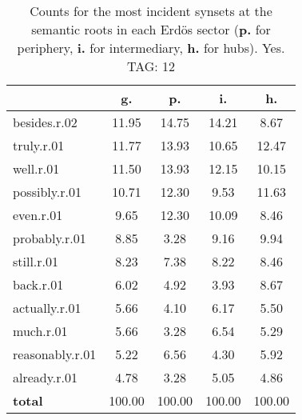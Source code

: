 \begin{table}[h!]
\begin{center}
\begin{tabular}{| l || c | c | c | c |}\hline
 & {\bf g.} & {\bf p.} & {\bf i.} & {\bf h.} \\\hline\hline
besides.r.02 & 11.95  & 14.75  & 14.21  & 8.67 \\\hline
truly.r.01 & 11.77  & 13.93  & 10.65  & 12.47 \\\hline
well.r.01 & 11.50  & 13.93  & 12.15  & 10.15 \\\hline
possibly.r.01 & 10.71  & 12.30  & 9.53  & 11.63 \\\hline
even.r.01 & 9.65  & 12.30  & 10.09  & 8.46 \\\hline
probably.r.01 & 8.85  & 3.28  & 9.16  & 9.94 \\\hline
still.r.01 & 8.23  & 7.38  & 8.22  & 8.46 \\\hline
back.r.01 & 6.02  & 4.92  & 3.93  & 8.67 \\\hline
actually.r.01 & 5.66  & 4.10  & 6.17  & 5.50 \\\hline
much.r.01 & 5.66  & 3.28  & 6.54  & 5.29 \\\hline
reasonably.r.01 & 5.22  & 6.56  & 4.30  & 5.92 \\\hline
already.r.01 & 4.78  & 3.28  & 5.05  & 4.86 \\\hline\hline
{{\bf total}} & 100.00  & 100.00  & 100.00  & 100.00 \\\hline
\end{tabular}
\caption{Counts for the most incident synsets at the semantic roots in each Erd\"os sector ({\bf p.} for periphery, {\bf i.} for intermediary, {\bf h.} for hubs). Yes. TAG: 12}
\end{center}
\end{table}